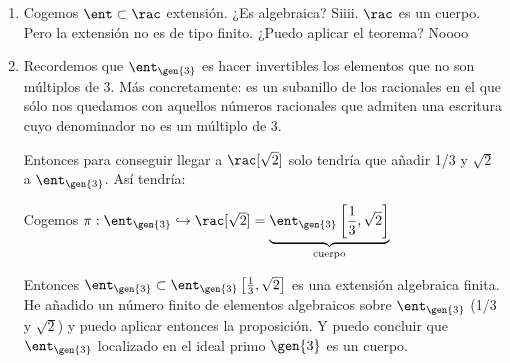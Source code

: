 \begin{example}
	\begin{enumerate}
		\item Cogemos $\ent \subset \rac$ extensión. ¿Es algebraica? Siiii. $\rac$ es un cuerpo. Pero la extensión no es de tipo finito. ¿Puedo aplicar el teorema?  Noooo
		\item
		Recordemos que $\ent_{\gen{3}}$ es hacer invertibles los elementos que no son múltiplos de 3. Más concretamente: es un subanillo de los racionales en el que sólo nos quedamos con aquellos números racionales que admiten una escritura cuyo denominador no es un múltiplo de 3.

		Entonces para conseguir llegar a $\rac[\sqrt{2}]$ solo tendría que añadir 1/3 y $\sqrt{2}$ a $\ent_{\gen{3}}$. Así tendría:

		Cogemos $\pi: \ent_{\gen{3}} \hookrightarrow \rac[\sqrt{2}]=
		\underbrace{\ent_{\gen{3}}\left[\frac{1}{3}, \sqrt{2}\right]}_{\text{cuerpo}}$

		Entonces $\ent_{\gen{3}} \subset	 \ent_{\gen{3}}\left[\frac{1}{3},\sqrt{2}\right]$ es una extensión algebraica finita. He añadido un número finito de elementos algebraicos sobre $\ent_{\gen{3}}$ (1/3 y $\sqrt{2}$) y puedo aplicar entonces la proposición. Y puedo concluir que $\ent_{\gen{3}}$ localizado en el ideal primo $\gen{3}$ es un cuerpo.
	\end{enumerate}
\end{example}

